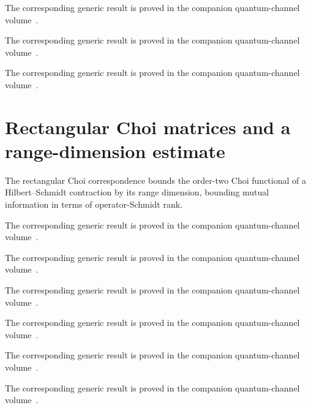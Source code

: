 The corresponding generic result is proved in the companion quantum-channel volume~\cite[``Order-two sandwiched functional under support compression'']{QICLean2026Blueprint}.



The corresponding generic result is proved in the companion quantum-channel volume~\cite[``Reduction of the singular order-two comparison to the faithful case'']{QICLean2026Blueprint}.



The corresponding generic result is proved in the companion quantum-channel volume~\cite[``Relative entropy bounded by the support-restricted order-two functional'']{QICLean2026Blueprint}.


\section{Rectangular Choi matrices and a range-dimension estimate}

The rectangular Choi correspondence \cite[Proposition~2.1]{Wolf2012Quantum}
bounds the order-two Choi functional of a Hilbert--Schmidt contraction by its
range dimension, bounding mutual information in terms of operator-Schmidt rank.


The corresponding generic result is proved in the companion quantum-channel volume~\cite[``Matrix of a linear map in matrix-unit bases'']{QICLean2026Blueprint}.



The corresponding generic result is proved in the companion quantum-channel volume~\cite[``Unnormalized rectangular Choi matrix'']{QICLean2026Blueprint}.



The corresponding generic result is proved in the companion quantum-channel volume~\cite[``Frobenius norm under rectangular Choi reshaping'']{QICLean2026Blueprint}.



The corresponding generic result is proved in the companion quantum-channel volume~\cite[``Matrix-unit Parseval identity for a rectangular Choi matrix'']{QICLean2026Blueprint}.



The corresponding generic result is proved in the companion quantum-channel volume~\cite[``Hilbert--Schmidt contraction'']{QICLean2026Blueprint}.



The corresponding generic result is proved in the companion quantum-channel volume~\cite[``Rectangular Choi norm bounded by the range dimension'']{QICLean2026Blueprint}.



